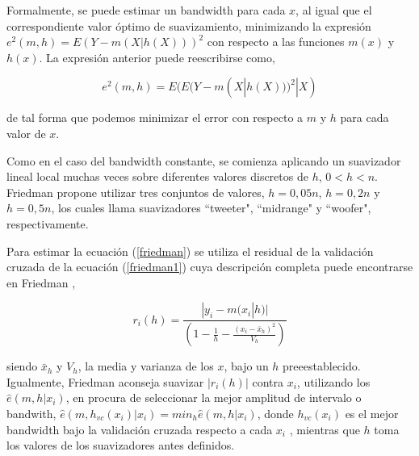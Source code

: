 \hspace*{0.4 cm} Formalmente, se puede estimar un bandwidth para cada $x$, al igual que el correspondiente valor \'optimo de suavizamiento, minimizando la expresi\'on $e^{2}(m,h) = E(Y - m(X|h(X)))^2$ con respecto a las funciones $m(x)$ y $h(x)$. La expresi\'on anterior puede reescribirse como,

\vspace*{0.2 cm}

\begin{equation}
e^{2}(m,h) = E(E(Y - m(X|h(X)))^2|X)
\label{friedman}
\end{equation}

\vspace*{0.2 cm}

\noindent de tal forma que podemos minimizar el error con respecto a $m$ y $h$ para cada valor de $x$.

\hspace*{0.4 cm} Como en el caso del bandwidth constante, se comienza aplicando un suavizador lineal local muchas veces sobre diferentes valores discretos de $h$, $0 < h < n$. Friedman \cite{F} propone utilizar tres conjuntos de valores, $h=0,05n$, $h=0,2n$ y $h=0,5n$, los cuales llama suavizadores ``tweeter", ``midrange" y ``woofer", respectivamente.

\hspace*{0.4 cm} Para estimar la ecuaci\'on (\ref{friedman}) se utiliza el residual de la validaci\'on cruzada de la ecuaci\'on (\ref{friedman1}) cuya descripci\'on completa puede encontrarse en Friedman \cite{F},

\vspace*{0.2 cm}

\begin{equation}
 r_{i}(h)= \frac{|y_{i}-m(x_{i}|h)|}{\left(1-\frac{1}{h}-\frac{(x_{i}-\bar{x}_{h})^2}{V_{h}}\right)}  
 \label{friedman1}
\end{equation}

\vspace*{0.2 cm}

\noindent siendo $\bar{x}_{h}$ y $V_{h}$, la media y varianza de los $x$, bajo un $h$ preeestablecido. Igualmente, Friedman \cite{F} aconseja suavizar $|r_{i}(h)|$ contra $x_{i}$, utilizando los $\hat{e}(m, h|x_{i})$, en procura de seleccionar la mejor amplitud de intervalo o bandwith, $\hat{e}(m, h_{vc}(x_{i})|x_{i})=min_{h} \hat{e}(m, h|x_{i})$, donde $h_{vc} (x_{i})$ es el mejor bandwidth bajo la validaci\'on cruzada respecto a cada $x_{i}$ , mientras que $h$ toma los valores de los suavizadores antes definidos.

